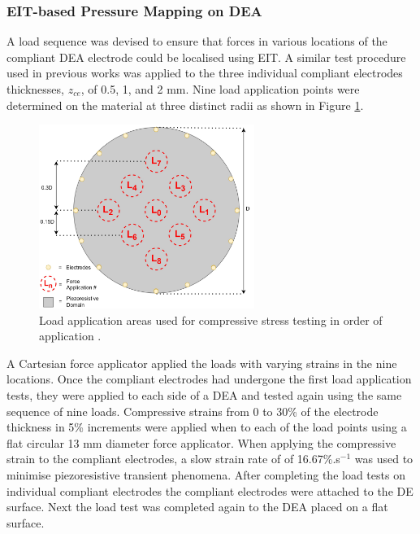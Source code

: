 \subsubsection{EIT-based Pressure Mapping on DEA}
\label{subsubsec:eit_test}
A load sequence was devised to ensure that forces in various locations of the compliant DEA electrode could be localised using EIT. A similar test procedure used in previous works \cite{Ellingham2024, Ellingham2024a} was applied to the three individual compliant electrodes thicknesses, $z_{ce}$, of 0.5, 1, and 2 mm. Nine load application points were determined on the material at three distinct radii as shown in Figure \ref{fig:force_app_map}.
\begin{figure}[H]
	\centering
	\includegraphics[width=7cm]{Figures/EIT_force_app_points_v3.11.jpg}
	\vspace{0.2cm}
	\caption{Load application areas used for compressive stress testing in order of application \cite{Ellingham2024} .}
	\label{fig:force_app_map}
\end{figure}
A Cartesian force applicator applied the loads with varying strains in the nine locations. Once the compliant electrodes had undergone the first load application tests, they were applied to each side of a DEA and tested again using the same sequence of nine loads. Compressive strains from 0 to 30\% of the electrode thickness in 5\% increments were applied when to each of the load points using a flat circular 13 mm diameter force applicator. When applying the compressive strain to the compliant electrodes, a slow strain rate of of 16.67\%.s$^{-1}$ was used to minimise piezoresistive transient phenomena. After completing the load tests on individual compliant electrodes the compliant electrodes were attached to the DE surface. Next the load test was completed again to the DEA placed on a flat surface.
